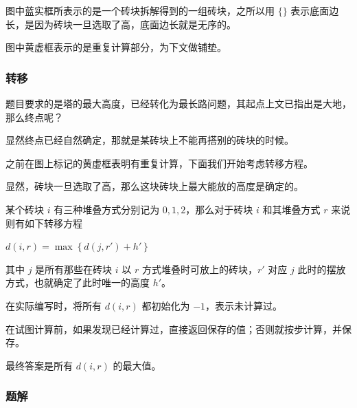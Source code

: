 图中蓝实框所表示的是一个砖块拆解得到的一组砖块，之所以用 $\{\}$ 表示底面边长，是因为砖块一旦选取了高，底面边长就是无序的。

图中黄虚框表示的是重复计算部分，为下文做铺垫。

\subsubsection{转移}

题目要求的是塔的最大高度，已经转化为最长路问题，其起点上文已指出是大地，那么终点呢？

显然终点已经自然确定，那就是某砖块上不能再搭别的砖块的时候。

之前在图上标记的黄虚框表明有重复计算，下面我们开始考虑转移方程。

显然，砖块一旦选取了高，那么这块砖块上最大能放的高度是确定的。

某个砖块 $i$ 有三种堆叠方式分别记为 $0, 1, 2$，那么对于砖块 $i$ 和其堆叠方式 $r$ 来说则有如下转移方程

$d(i, r) = \max\left\{d(j, r') + h'\right\}$

其中 $j$ 是所有那些在砖块 $i$ 以 $r$ 方式堆叠时可放上的砖块，$r'$ 对应 $j$ 此时的摆放方式，也就确定了此时唯一的高度 $h'$。

在实际编写时，将所有 $d(i, r)$ 都初始化为 $-1$，表示未计算过。

在试图计算前，如果发现已经计算过，直接返回保存的值；否则就按步计算，并保存。

最终答案是所有 $d(i, r)$ 的最大值。

\subsubsection{题解}

